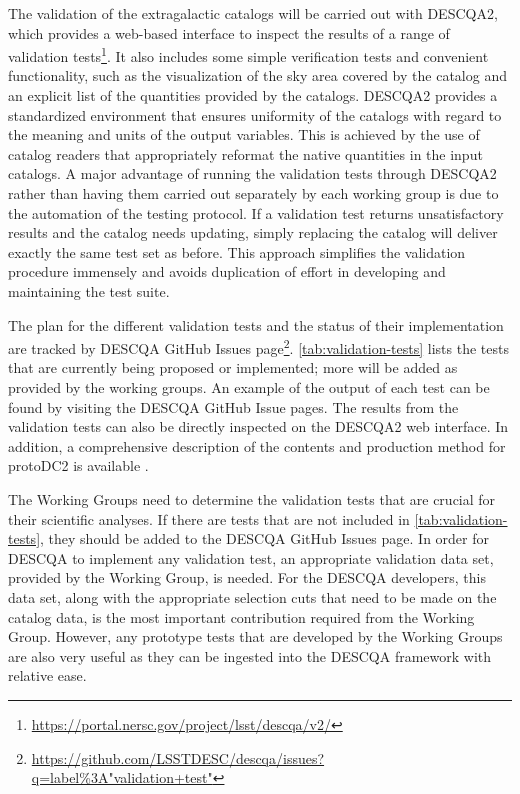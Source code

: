 \documentclass[preprint,times]{aastex61}
\begin{document}
The validation of the extragalactic catalogs will be carried out with DESCQA2, which provides a web-based interface to inspect the results of a range of validation tests\footnote{\url{https://portal.nersc.gov/project/lsst/descqa/v2/}}. It also includes some simple verification tests and convenient functionality, such as the visualization of the sky area covered by the catalog and an explicit list of the quantities provided by the catalogs. 
DESCQA2 provides a standardized environment that ensures uniformity of the catalogs with regard to the meaning and units of the output variables. This is achieved by the use of catalog readers that appropriately reformat the native quantities in the input catalogs. 
A major advantage of running the validation tests through DESCQA2 rather than having them carried out separately by each working group is due to the automation of the testing protocol. If a validation test returns unsatisfactory results and the catalog needs updating, simply replacing the catalog will deliver exactly the same test set as before. This approach simplifies the validation procedure immensely and avoids duplication of effort in developing and maintaining the test suite. 

The plan for the different validation tests and the status of their implementation are tracked by DESCQA GitHub Issues page\footnote{\url{https://github.com/LSSTDESC/descqa/issues?q=label\%3A"validation+test"}}. 
\autoref{tab:validation-tests} lists the tests that are currently being proposed or implemented; more will be added as provided by the working groups.
An example of the output of each test can be found by visiting the DESCQA GitHub Issue pages.
The results from the validation tests can also be directly inspected on the DESCQA2 web interface. In addition, a comprehensive description of the contents and production method for protoDC2 is available \cite{protoDC2}.

The Working Groups need to determine the validation tests that are crucial for their scientific analyses. If there are tests that are not included in \autoref{tab:validation-tests}, they should be added to the DESCQA GitHub Issues page. In order for DESCQA to implement any validation test, an appropriate validation data set, provided by the Working Group, is needed. For the DESCQA developers, this data set, along with the appropriate selection cuts that need to be made on the catalog data, is the most important contribution required from the Working Group. However, any prototype tests that are developed by the Working Groups are also very useful as they can be ingested into the DESCQA framework with relative ease.
\end{document}

